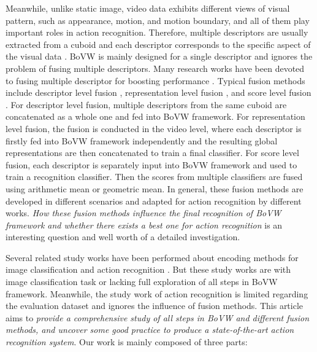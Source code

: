 \documentclass[twocolumn]{svjour3}          \smartqed  \usepackage{slashbox}
\begin{document}
Meanwhile, unlike static image, video data exhibits different views of visual pattern, such as appearance, motion, and motion boundary, and all of them play important roles in action recognition. Therefore, multiple descriptors are usually extracted from a cuboid and each descriptor corresponds to the specific aspect of the visual data \cite{WangKSL13,LaptevMSR08}. BoVW is mainly designed for a single descriptor and ignores the problem of fusing multiple descriptors. Many research works have been devoted to fusing multiple descriptor for boosting performance  \cite{GehlerN09,VedaldiGVZ09,TangYLK13,WangS13a,CaiWPQ14}. Typical fusion methods include descriptor level fusion \cite{LaptevMSR08,WangWQ12}, representation level fusion \cite{Wang13,WangKSL13}, and score level fusion \cite{TangYLK13,MyersNHPNSHKSSS14}. For descriptor level fusion, multiple descriptors from the same cuboid are concatenated as a whole one and fed into BoVW framework. For representation level fusion, the fusion is conducted in the video level, where each descriptor is firstly fed into BoVW framework independently and the resulting global representations are then concatenated to train a final classifier. For score level fusion, each descriptor is separately input into BoVW framework and used to train a recognition classifier. Then the scores from multiple classifiers are fused using arithmetic mean or geometric mean. In general, these fusion methods are developed in different scenarios and adapted for action recognition by different works. \emph{How these fusion methods influence the final recognition of BoVW framework and whether there exists a best one for action recognition} is an interesting question and well worth of a detailed investigation.

Several related study works have been performed about encoding methods for image classification \cite{ChatfieldLVZ11,HuangWWT14} and action recognition \cite{WangWQ12}. But these study works are with image classification task or lacking full exploration of all steps in BoVW framework. Meanwhile, the study work of action recognition \cite{WangWQ12} is limited regarding the evaluation dataset and ignores the influence of fusion methods. This article aims to \emph{provide a comprehensive study of all steps in BoVW and different fusion methods, and uncover some good practice to produce a state-of-the-art action recognition system}. Our work is mainly composed of three parts:
\end{document}
